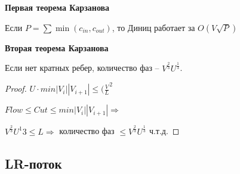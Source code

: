 \begin{theorem}{\bf Первая теорема Карзанова}

Если $P = \sum  \min(c_{in}, c_{out})$, то Диниц работает за $O(V \sqrt{P})$
\end{theorem}

\begin{theorem}{\bf Вторая теорема Карзанова}

Если нет кратных ребер, количество фаз -- $V^\frac{2}{3} U^\frac{1}{3}$.
\end{theorem}
\begin{proof}
$U \cdot min|V_i||V_{i + 1}| \leq (\frac{V}{L}^2$

$Flow \leq Cut \leq  min|V_i||V_{i + 1}| \Rightarrow $

 $V^\frac{2}{3}U^{1}{3}\leq L \Rightarrow$
 количество фаз $\leq V^\frac{2}{3} U^\frac{1}{3}$ ч.т.д.
\end{proof}

\subsection{LR-поток}


